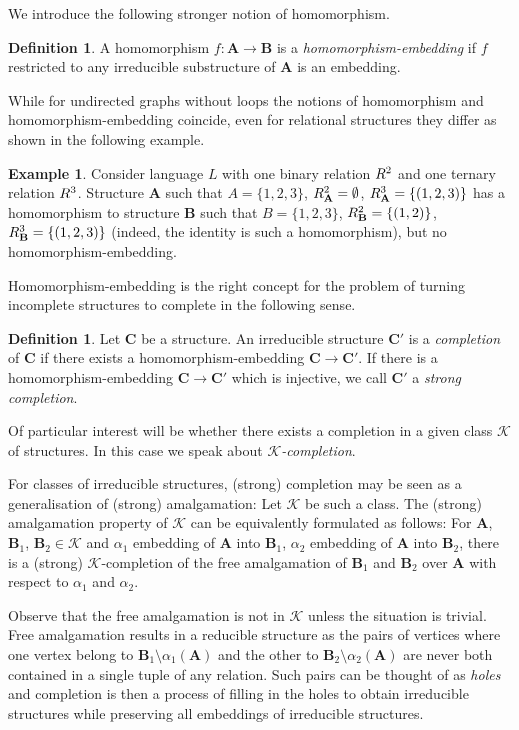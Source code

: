 \documentclass{elsarticle}
\def\str#1{\mathbf {#1}}
\def\nbrel#1#2{R\ifstrempty{#1}{}{_{#1}}\ifstrempty{#2}{}{^{#2}}}
\def\rel#1#2{\nbrel{\ifstrempty{#1}{}{\str{#1}}}{#2}}
\def\K{{\mathcal K}}
\theoremstyle{plain}
\theoremstyle{definition}
\newtheorem{definition}[theorem]{Definition}
\newtheorem{example}[theorem]{Example}
\theoremstyle{remark}
\begin{document}
We introduce the following stronger notion of homomorphism.
\begin{definition}
\label{def:homembed}
 A homomorphism
$f\colon \str{A}\to\str{B}$ is a \emph{homomorphism-embedding}  if $f$ restricted to any irreducible substructure of $\str{A}$      
is an embedding.
\end{definition}
While for undirected graphs without loops the notions of homomorphism and homo\-mor\-phism-em\-bed\-ding coincide, even for relational structures they differ
as shown in the following example.
\begin{example}
Consider language $L$ with one binary relation $\rel{}{2}$ and one ternary relation $\rel{}{3}$.
Structure $\str{A}$ such that $A=\{1,2,3\}$, $\rel{A}{2}=\emptyset$, $\rel{A}{3}=\{(1,2,3)\}$ has a homomorphism to structure $\str{B}$ such that $B=\{1,2,3\}$, $\rel{B}{2}=\{(1,2)\}$, $\rel{B}{3}=\{(1,2,3)\}$ (indeed, the identity is such a homomorphism), but no homomorphism-embedding.
\end{example}
Homomorphism-embedding is the right concept for the problem of turning incomplete structures to complete in the following sense.
\begin{definition}
\label{defn:completion}
Let $\str{C}$ be a structure. An irreducible structure $\str{C}'$ is a \emph{completion}
of $\str{C}$ if there exists a homomorphism-embedding $\str{C}\to\str{C}'$.
If there is a homomorphism-embedding $\str{C}\to\str{C}'$ which is injective,
we call $\str{C}'$ a \emph{strong completion}.

Of particular interest will be whether there exists a completion in a given class $\mathcal K$ of structures. In this case we speak about \emph{$\mathcal K$-completion}.
\end{definition}
For classes of irreducible structures, (strong) completion may be seen as a generalisation of (strong) amalgamation: Let $\K$ be such a class. The (strong)
amalgamation property of $\K$ can be equivalently formulated as follows: For $\str{A}$, $\str{B}_1$, $\str{B}_2 \in \K$ and $\alpha_1$ embedding of $\str{A}$ into $\str{B}_1$, $\alpha_2$ embedding of $\str{A}$ into $\str{B}_2$, there is a (strong) $\mathcal K$-completion
of the free amalgamation of $\str{B}_1$ and $\str{B}_2$ over $\str{A}$ with respect to $\alpha_1$ and $\alpha_2$.

Observe that the free amalgamation is not in $\K$ unless the situation is trivial.
Free amalgamation results in a reducible structure as the pairs of vertices  where
one vertex belong to $\str{B}_1\setminus \alpha_1(\str{A})$ and the other to $\str{B}_2\setminus \alpha_2(\str{A})$ are never both contained in a single tuple
of any relation. Such pairs can be thought of as  \emph{holes} and completion is then a process of filling in the
holes to obtain irreducible structures while preserving all embeddings of irreducible structures.
\end{document}
